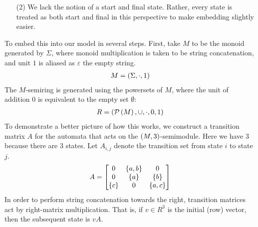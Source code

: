 \begin{example}
\begin{enumerate}
    \item[(2)]
      We lack the notion of a start and final state.
      Rather, every state is treated as both start and final in
      this perspective to make embedding slightly easier.
  \end{enumerate}
  To embed this into our model in several steps.
  First, take \(M\) to be the monoid generated by \(\Sigma\),
  where monoid multiplication is taken to be string concatenation,
  and unit \(1\) is aliased as \(\varepsilon\) the empty string.
  \begin{align*}
    M = \left(\Sigma, \cdot, 1\right)
  \end{align*}
  The \(M\)-semiring is generated using the powersets of \(M\),
  where the unit of addition \(0\) is equivalent to the
  empty set \(\emptyset\):
  \begin{align*}
    R = \left(\mathcal{P}\left(M\right), \cup, \cdot, 0, 1\right)
  \end{align*}
  To demonstrate a better picture of how this works, we construct a
  transition matrix \(A\) for the automata
  that acts on the \(\left(M, 3\right)\)-semimodule.
  Here we have \(3\) because there are \(3\) states.
  Let \(A_{i, j}\) denote the transition set from state \(i\) to
  state \(j\).
  \begin{align*}
    A =
      \begin{bmatrix}
        0 & \left\{a, b\right\} & 0 \\
        0 & \left\{a\right\} & \left\{b\right\} \\
        \left\{c\right\} & 0 & \left\{a, c\right\}
      \end{bmatrix}
  \end{align*}
  In order to perform string concatenation towards the right,
  transition matrices act by right-matrix multiplication.
  That is, if \(v \in R^3\) is the initial (row) vector,
  then the subsequent state is \(v A\).


\end{example}
